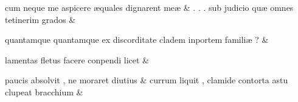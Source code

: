 \documentclass[12pt,onecolumn,twoside,a4paper]{memoir}
\begin{document}
\begin{pairs}
\begin{Leftside}
                         \stanza {}
                     cum
                              neque
                              me
                              aspicere
                              æquales
                              dignarent
                              meæ \&
                         \stanza {}
                     .
                              .
                              .
                              sub
                              judicio
                              quæ
                              omnes
                              tetinerim
                              grados \&
                         \stanza {}
                     
                              quantamque
                              {quantamque}
                              ex
                              discorditate
                              cladem
                              inportem
                              familiæ
                              ? \&
                         \stanza {}
                     
                              lamentas
                              fletus
                              facere
                              conpendi
                              licet \&
                         \stanza {}
                     
                              paucis
                              absolvit
                              ,
                              ne
                              moraret
                              diutius \&
                         \stanza {}
                     currum
                              liquit
                              ,
                              clamide
                              contorta
                              astu
                              clupeat
                              bracchium \&
                         \stanza {}
                     

\end{Leftside}
\end{pairs}
\end{document}
